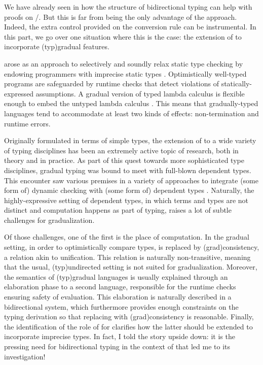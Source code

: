 We have already seen in  how the structure of bidirectional typing can
help with proofs on /. But this is far from being the only advantage of
the approach. Indeed, the extra control provided on the conversion rule can be instrumental.
In this part, we go over one situation where this is the case: the extension of  to
incorporate \kl(typ){gradual} features.

 arose as an approach to selectively and soundly relax static type
checking by endowing programmers with imprecise static
types . Optimistically well-typed
programs are safeguarded by runtime checks that detect violations of
statically-expressed assumptions. A gradual version of typed lambda
calculus is flexible enough to embed the untyped lambda
calculus \cite{Siek2015}.
This means that gradually-typed languages tend to accommodate at least
two kinds of effects: non-termination and runtime errors.

Originally formulated in terms of simple types, the extension of 
to a wide variety of typing disciplines has been an extremely active topic of
research, both in theory and in practice. As part of this quest towards more
sophisticated type disciplines, gradual typing was bound to meet with full-blown
dependent types. This encounter saw various premises in a variety of approaches
to integrate (some form of) dynamic checking with (some form of) dependent
types .
Naturally, the highly-expressive setting of dependent types, in which terms and
types are not distinct and computation happens as part of typing, raises a lot
of subtle challenges for gradualization.

Of those challenges, one of the first is the place of computation.
In the gradual setting, in order to optimistically compare types,
 is replaced by \kl(grad){consistency}, a relation
akin to unification. This relation is naturally
non-transitive, meaning that the usual, \kl(typ){undirected} setting is not suited for
gradualization.%
Moreover, the semantics of \kl(typ){gradual} languages is usually explained
through an elaboration phase to a second language, responsible for the runtime checks ensuring
safety of evaluation. This elaboration is naturally described in a bidirectional
system, which furthermore provides enough constraints on the typing derivation so that replacing
 with \kl(grad){consistency} is reasonable. Finally, the identification of
the role of  for  clarifies
how the latter should be extended to incorporate imprecise types.
In fact, I told the story upside down: it is the pressing need for bidirectional typing
in the context of  that led me to its investigation!

